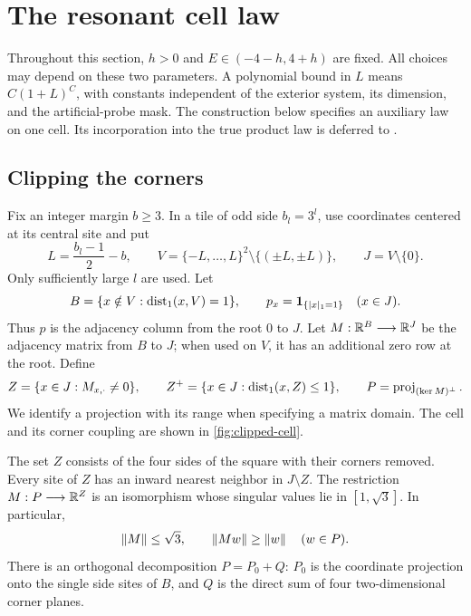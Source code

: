 \section{The resonant cell law}
\label{sec:resonant}

Throughout this section, $h>0$ and $E\in(-4-h,4+h)$ are fixed.
All choices may depend on these two parameters.  A polynomial bound in
$L$ means $C(1+L)^C$, with constants independent of the exterior system,
its dimension, and the artificial-probe mask.  The construction below
specifies an auxiliary law on one cell.  Its incorporation into the true
product law is deferred to .

\subsection{Clipping the corners}

Fix an integer margin $b\ge3$.  In a tile of odd side $b_l=3^l$, use
coordinates centered at its central site and put
\begin{equation}
 L=\frac{b_l-1}{2}-b,\qquad
 V=\{-L,\ldots,L\}^2\setminus\{(\pm L,\pm L)\},\qquad
 J=V\setminus\{0\}.
 \label{cell:sets}
\end{equation}
Only sufficiently large $l$ are used.  Let
\[
 B=\{x\notin V:\operatorname{dist}_1(x,V)=1\},
 \qquad p_x=\mathbf 1_{\{|x|_1=1\}}\quad(x\in J).
\]
Thus $p$ is the adjacency column from the root $0$ to $J$.  Let
$M:\mathbb R^B\longrightarrow\mathbb R^J$ be the adjacency matrix from $B$ to $J$;
when used on $V$, it has an additional zero row at the root.  Define
\begin{equation}
 Z=\{x\in J:M_{x,\cdot}\ne0\},\qquad
 Z^+=\{x\in J:\operatorname{dist}_1(x,Z)\le1\},\qquad
 P=\operatorname{proj}_{(\ker M)^\perp}.
 \label{cell:boundary-spaces}
\end{equation}
We identify a projection with its range when specifying a matrix domain.
The cell and its corner coupling are shown in \cref{fig:clipped-cell}.

\begin{lemma}\label{cell:geometry}
The set $Z$ consists of the four sides of the square with their corners
removed.  Every site of $Z$ has an inward nearest neighbor in $J\setminus
Z$.  The restriction $M:P\longrightarrow\mathbb R^Z$ is an isomorphism whose
singular values lie in $[1,\sqrt3]$.  In particular,
\[
 \left\lVert M\right\rVert\le\sqrt3,\qquad
 \left\lVert Mw\right\rVert\ge\left\lVert w\right\rVert\quad(w\in P).
\]
There is an orthogonal decomposition $P=P_0+Q$: $P_0$ is the coordinate
projection onto the single side sites of $B$, and $Q$ is the direct sum
of four two-dimensional corner planes.
\end{lemma}


